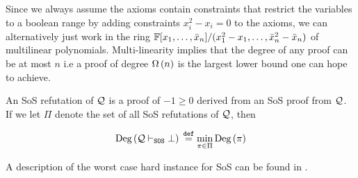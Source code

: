 \documentclass[11pt]{article}
\begin{document}
Since we always assume the axioms contain constraints that restrict the variables to a boolean range by adding constraints $x_i^2 - x_i=0$ to the axioms, we can alternatively just work in the ring $\mathbb{F}[x_1, \dots, \bar{x}_n]/(x_1^2 - x_1, \dots, \bar{x}_n^2 - \bar{x}_n)$ of multilinear polynomials.
Multi-linearity implies that the degree of any proof can be at most $n$ i.e a proof of degree $\Omega\left(n\right)$ is the largest lower bound one can hope to achieve.

\begin{definition}
An SoS refutation of $\mathcal{Q}$ is a proof of $-1 \geq 0$ derived from an SoS proof from $\mathcal{Q}$. If we let $\Pi$ denote the set of all SoS refutations of $\mathcal{Q}$, then  

\[ \text{Deg}\left(\mathcal{Q} \vdash_{\texttt{SOS}} \bot\right) \text{}\overset{\mathtt{def}}{=} \min_{\pi \in \Pi}\text{Deg}\left(\pi\right)\]
	
\end{definition}




A description of the  worst case hard instance for SoS can be found in \citep[Theorem A.3]{Austrin_2022}.
\end{document}
